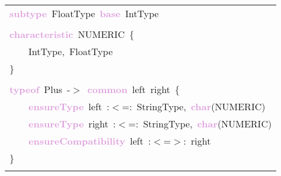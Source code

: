 \begin{tabular}[t]{l}
\noindent
\mbox{}\textbf{\textcolor{Plum}{subtype}}\ FloatType\ \textbf{\textcolor{Plum}{base}}\ IntType \\
\mbox{} \\
\mbox{}\textbf{\textcolor{Plum}{characteristic}}\ NUMERIC\ \{ \\
\mbox{}\ \ \ \ IntType,\ FloatType \\
\mbox{}\}\  \\
\mbox{} \\
\mbox{}\textbf{\textcolor{Plum}{typeof}}\ Plus\ -$>$\ \textbf{\textcolor{Plum}{common}}\ left\ right\ \{ \\
\mbox{}\ \ \ \ \textbf{\textcolor{Plum}{ensureType}}\ left\ :$<$=:\ StringType,\ \textbf{\textcolor{Plum}{char}}(NUMERIC) \\
\mbox{}\ \ \ \ \textbf{\textcolor{Plum}{ensureType}}\ right\ :$<$=:\ StringType,\ \textbf{\textcolor{Plum}{char}}(NUMERIC) \\
\mbox{}\ \ \ \ \textbf{\textcolor{Plum}{ensureCompatibility}}\ left\ :$<$=$>$:\ right \\
\mbox{}\} \\
\mbox{}
\end{tabular}
